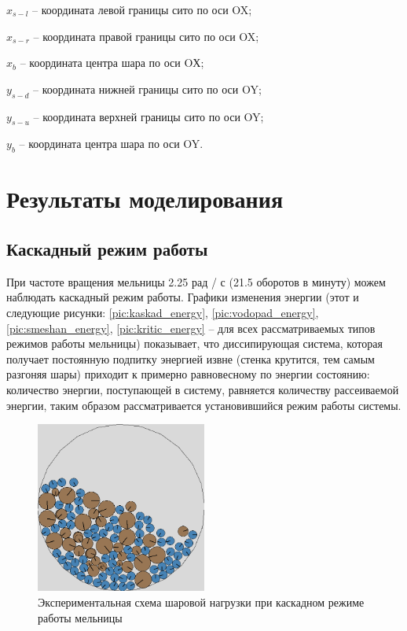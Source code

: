 \documentclass[utf8x, 14pt, oneside, a4paper]{article}
\begin{document}
$x_{s-l}$ -- координата левой границы сито по оси OX;

$x_{s-r}$ -- координата правой границы сито по оси OX;

$x_b$ -- координата центра шара по оси OХ;

$y_{s-d}$ -- координата нижней границы сито по оси OY;

$y_{s-u}$ -- координата верхней границы сито по оси OY;

$y_b$ -- координата центра шара по оси OY.




\pagebreak

\section{Результаты моделирования}

\subsection{Каскадный режим работы}

При частоте вращения мельницы 2.25 рад / с (21.5 оборотов в минуту) можем наблюдать каскадный режим работы.
Графики изменения энергии (этот и следующие рисунки: \ref{pic:kaskad_energy}, \ref{pic:vodopad_energy}, \ref{pic:smeshan_energy}, \ref{pic:kritic_energy} -- для всех рассматриваемых типов режимов работы мельницы) показывает, что диссипирующая система, которая получает постоянную подпитку энергией извне (стенка крутится, тем самым разгоняя шары) приходит к примерно равновесному по энергии состоянию: количество энергии, поступающей в систему, равняется количеству рассеиваемой энергии, таким образом рассматривается установившийся режим работы системы.

\begin{figure}[H]
	\centering
	\includegraphics[width=0.5\textwidth]{kaskad_result} 
	\caption{Экспериментальная схема шаровой нагрузки при каскадном режиме работы мельницы}
	\label{pic:kaskad_result}
\end{figure} 
\end{document}
